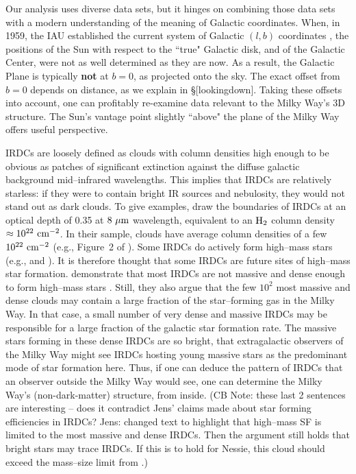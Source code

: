 \documentclass[]{article}
\begin{document}
Our analysis uses diverse data sets, but it hinges on combining those
data sets with a modern understanding of the meaning of Galactic
coordinates. When, in 1959, the IAU established the current system of
Galactic $(l,b)$ coordinates \citep{Blaauw1959}, the positions of the
Sun with respect to the ``true" Galactic disk, and of the Galactic
Center, were not as well determined as they are now. As a result, the
Galactic Plane is typically \textbf{not} at $b=0$, as projected onto the
sky. The exact offset from $b=0$ depends on distance, as we explain in
§{[}lookingdown{]}. Taking these offsets into account, one can
profitably re-examine data relevant to the Milky Way's 3D structure. The
Sun's vantage point slightly ``above" the plane of the Milky Way offers
useful perspective.

IRDCs are loosely defined as clouds with column densities high enough to
be obvious as patches of significant extinction against the diffuse
galactic background mid--infrared wavelengths. This implies that IRDCs
are relatively starless: if they were to contain bright IR sources and
nebulosity, they would not stand out as dark clouds. To give examples,
\citet{Peretto2009a} draw the boundaries of IRDCs at an optical depth of
0.35 at $8~\rm{}\mu{}m$ wavelength, equivalent to an $\rm{}H_2$ column
density $\approx{}10^{22}~\rm{}cm^{-2}$. In their sample, clouds have
average column densities of a few $10^{22}~\rm{}cm^{-2}$ (e.g., Figure~2
of \citealt{peretto2010:irdcs-mass-density}). Some IRDCs do actively
form high--mass stars (e.g., \citealt{pillai2006:g11} and
\citealt{rathborne2007:irdc-msf}). It is therefore thought that some
IRDCs are future sites of high--mass star formation.
\citet{kauffmann2010:irdcs} demonstrate that most IRDCs are not massive
and dense enough to form high--mass stars \citep{kauffmann2010:irdcs}.
Still, they also argue that the few $10^2$ most massive and dense clouds
may contain a large fraction of the star--forming gas in the Milky Way.
In that case, a small number of very dense and massive IRDCs may be
responsible for a large fraction of the galactic star formation rate.
The massive stars forming in these dense IRDCs are so bright, that
extragalactic observers of the Milky Way might see IRDCs hosting young
massive stars as the predominant mode of star formation here. Thus, if
one can deduce the pattern of IRDCs that an observer outside the Milky
Way would see, one can determine the Milky Way's (non-dark-matter)
structure, from inside. (CB Note: these last 2 sentences are interesting
-- does it contradict Jens' claims made about star forming efficiencies
in IRDCs? Jens: changed text to highlight that high--mass SF is limited
to the most massive and dense IRDCs. Then the argument still holds that
bright stars may trace IRDCs. If this is to hold for Nessie, this cloud
should exceed the mass--size limit from \citep{kauffmann2010:irdcs}.)
\end{document}
